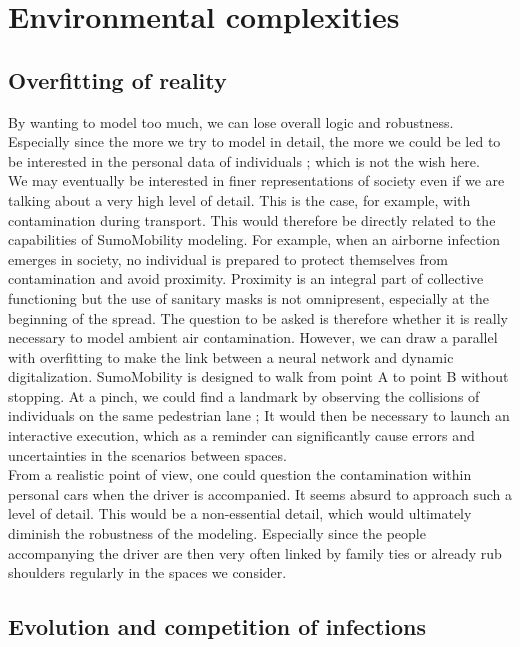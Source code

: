 \chapter{Environmental complexities}

\section{Overfitting of reality}

By wanting to model too much, we can lose overall logic and robustness. Especially since the more we try to model in detail, the more we could be led to be interested in the personal data of individuals ; which is not the wish here.\\

We may eventually be interested in finer representations of society even if we are talking about a very high level of detail. This is the case, for example, with contamination during transport. This would therefore be directly related to the capabilities of SumoMobility modeling. For example, when an airborne infection emerges in society, no individual is prepared to protect themselves from contamination and avoid proximity. Proximity is an integral part of collective functioning but the use of sanitary masks is not omnipresent, especially at the beginning of the spread. The question to be asked is therefore whether it is really necessary to model ambient air contamination. However, we can draw a parallel with overfitting to make the link between a neural network and dynamic digitalization. SumoMobility is designed to walk from point A to point B without stopping. At a pinch, we could find a landmark by observing the collisions of individuals on the same pedestrian lane ; It would then be necessary to launch an interactive execution, which as a reminder can significantly cause errors and uncertainties in the scenarios between spaces.\\

From a realistic point of view, one could question the contamination within personal cars when the driver is accompanied. It seems absurd to approach such a level of detail. This would be a non-essential detail, which would ultimately diminish the robustness of the modeling. Especially since the people accompanying the driver are then very often linked by family ties or already rub shoulders regularly in the spaces we consider.\\

\newpage

\section{Evolution and competition of infections}

